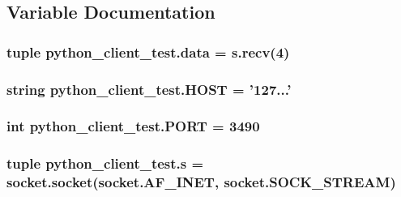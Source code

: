 \subsection{Variable Documentation}
\hypertarget{namespacepython__client__test_af417809fb76fdba5961ee4e000ccde71}{
\subsubsection[{data}]{\setlength{\rightskip}{0pt plus 5cm}tuple python\-\_\-client\-\_\-test.\-data = s.\-recv(4)}}\label{namespacepython__client__test_af417809fb76fdba5961ee4e000ccde71}
\hypertarget{namespacepython__client__test_a92606c7a15210740590acd070e01df55}{
\subsubsection[{H\-O\-S\-T}]{\setlength{\rightskip}{0pt plus 5cm}string python\-\_\-client\-\_\-test.\-H\-O\-S\-T = '127...'}}\label{namespacepython__client__test_a92606c7a15210740590acd070e01df55}
\hypertarget{namespacepython__client__test_ad1345f8ee5062de9e8a7ed7efdf18ac7}{
\subsubsection[{P\-O\-R\-T}]{\setlength{\rightskip}{0pt plus 5cm}int python\-\_\-client\-\_\-test.\-P\-O\-R\-T = 3490}}\label{namespacepython__client__test_ad1345f8ee5062de9e8a7ed7efdf18ac7}
\hypertarget{namespacepython__client__test_afe25ba75e651f13976e71c474188ef96}{
\subsubsection[{s}]{\setlength{\rightskip}{0pt plus 5cm}tuple python\-\_\-client\-\_\-test.\-s = socket.\-socket(socket.\-A\-F\-\_\-\-I\-N\-E\-T, socket.\-S\-O\-C\-K\-\_\-\-S\-T\-R\-E\-A\-M)}}\label{namespacepython__client__test_afe25ba75e651f13976e71c474188ef96}
